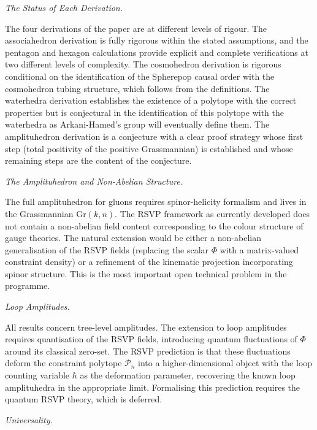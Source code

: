 \documentclass[12pt, oneside]{amsart}
\theoremstyle{plain}
\theoremstyle{definition}
\theoremstyle{remark}
\newcommand{\Gr}{\mathrm{Gr}}
\newcommand{\Phif}{\Phi}
\begin{document}
\medskip\noindent\textit{The Status of Each Derivation.}

The four derivations of the paper are at different levels of rigour. The associahedron derivation is fully rigorous within the stated assumptions, and the pentagon and hexagon calculations provide explicit and complete verifications at two different levels of complexity. The cosmohedron derivation is rigorous conditional on the identification of the Spherepop causal order with the cosmohedron tubing structure, which follows from the definitions. The waterhedra derivation establishes the existence of a polytope with the correct properties but is conjectural in the identification of this polytope with the waterhedra as Arkani-Hamed's group will eventually define them. The amplituhedron derivation is a conjecture with a clear proof strategy whose first step (total positivity of the positive Grassmannian) is established and whose remaining steps are the content of the conjecture.

\medskip\noindent\textit{The Amplituhedron and Non-Abelian Structure.}

The full amplituhedron for gluons requires spinor-helicity formalism and lives in the Grassmannian $\Gr(k,n)$. The RSVP framework as currently developed does not contain a non-abelian field content corresponding to the colour structure of gauge theories. The natural extension would be either a non-abelian generalisation of the RSVP fields (replacing the scalar $\Phif$ with a matrix-valued constraint density) or a refinement of the kinematic projection incorporating spinor structure. This is the most important open technical problem in the programme.

\medskip\noindent\textit{Loop Amplitudes.}

All results concern tree-level amplitudes. The extension to loop amplitudes requires quantisation of the RSVP fields, introducing quantum fluctuations of $\Phif$ around its classical zero-set. The RSVP prediction is that these fluctuations deform the constraint polytope $\mathcal{P}_n$ into a higher-dimensional object with the loop counting variable $\hbar$ as the deformation parameter, recovering the known loop amplituhedra in the appropriate limit. Formalising this prediction requires the quantum RSVP theory, which is deferred.

\medskip\noindent\textit{Universality.}
\end{document}
